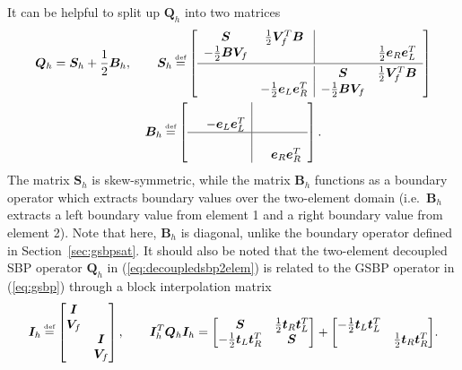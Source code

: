 \documentclass[onefignum,onetabnum,final]{siamart171218}
\newcommand{\LRs}[1]{\left[ #1 \right]}
\newcommand\myeq{\mathrel{\stackrel{\makebox[0pt]{\mbox{\normalfont\tiny def}}}{=}}}
\begin{document}
It can be helpful to split up $\bm{Q}_h$ into two matrices
\begin{gather*}
\bm{Q}_h = \bm{S}_h + \frac{1}{2}\bm{B}_h, \qquad
\bm{S}_h \myeq \LRs{\begin{array}{cc|cc}
\bm{S} &  \frac{1}{2}\bm{V}_f^T\bm{B} & & \\
 - \frac{1}{2}\bm{B}\bm{V}_f &  & & \frac{1}{2}\bm{e}_R\bm{e}_L^T\\ [.2em]
 \hline\\[-1.0em]
&& \bm{S} &  \frac{1}{2}\bm{V}_f^T\bm{B} \\
& -\frac{1}{2}\bm{e}_L\bm{e}_R^T &  - \frac{1}{2}\bm{B}\bm{V}_f &\\
\end{array}}\\
\bm{B}_h \myeq \LRs{\begin{array}{cc|cc}
&  & & \\
 & -\bm{e}_L\bm{e}_L^T & & \\
 \hline
&&  &  \\
&  && \bm{e}_R\bm{e}_R^T\\
\end{array}}.
\end{gather*}
The matrix $\bm{S}_h$ is skew-symmetric, while the matrix $\bm{B}_h$ functions as a boundary operator which extracts boundary values over the two-element domain (i.e.\ $\bm{B}_h$ extracts a left boundary value from element 1 and a right boundary value from element 2).  Note that here, $\bm{B}_h$ is diagonal, unlike the boundary operator defined in Section~\ref{sec:gsbpsat}.  It should also be noted that the two-element decoupled SBP operator $\bm{Q}_h$ in (\ref{eq:decoupledsbp2elem}) is related to the GSBP operator in (\ref{eq:gsbp}) through a block interpolation matrix
\[
\bm{I}_h \myeq \begin{bmatrix}
\bm{I} &\\
\bm{V}_f &\\
&\bm{I}\\
&\bm{V}_f\\
\end{bmatrix}, \qquad \bm{I}_h^T\bm{Q}_h\bm{I}_h = {\begin{bmatrix}
\bm{S}  & \frac{1}{2}\bm{t}_R\bm{t}_L^T \\
- \frac{1}{2}\bm{t}_L\bm{t}_R^T & \bm{S}
\end{bmatrix}}
+
{\begin{bmatrix}
-\frac{1}{2}\bm{t}_L\bm{t}_L^T  & \\
 & \frac{1}{2} \bm{t}_R\bm{t}_R^T
\end{bmatrix}}.
\]
\end{document}
